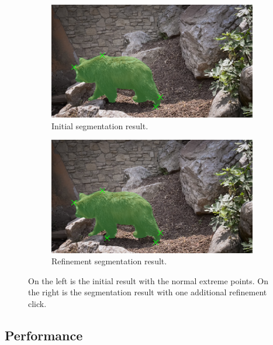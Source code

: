 \begin{figure} 
	\centering
	\begin{subfigure}[b]{0.45\textwidth}
		\centering
		\includegraphics[width=\textwidth]{figures/chap33_bear_initial_result.png}
		\caption{Initial segmentation result.}
		\label{fig:ch3:sec3:refinement_1}
	\end{subfigure}
	\hfill
	\begin{subfigure}[b]{0.45\textwidth}
		\centering
		\includegraphics[width=\textwidth]{figures/chap33_bear_refine_result.png}
		\caption{Refinement segmentation result.}
		\label{fig:ch3:sec3:refinement_2}
	\end{subfigure}
	\caption[DEXTR Refinement]{
		On the left is the initial result with the normal extreme points. 
		On the right is the segmentation result with one additional refinement click.
	} \label{fig:ch3:sec3:refinement}
\end{figure}


\subsection{Performance}\label{ord:ch3:sec3:subsec5}

